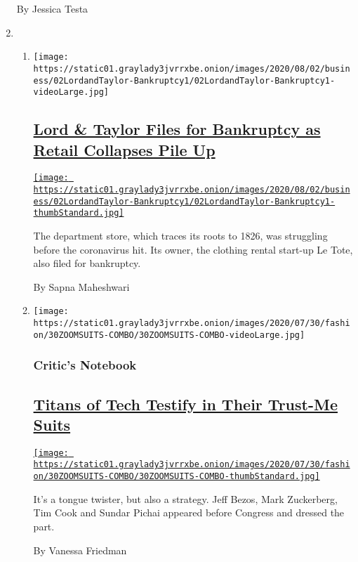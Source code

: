\begin{enumerate}
  By Jessica Testa
\item
  \begin{enumerate}
  \def\labelenumii{\arabic{enumii}.}
  \item
    \texttt{[image: https://static01.graylady3jvrrxbe.onion/images/2020/08/02/business/02LordandTaylor-Bankruptcy1/02LordandTaylor-Bankruptcy1-videoLarge.jpg]}

    \hypertarget{lord--taylor-files-for-bankruptcy-as-retail-collapses-pile-up}{%
    \subsection{\texorpdfstring{\href{/2020/08/02/business/Lord-and-Taylor-Bankruptcy.html}{Lord
    \& Taylor Files for Bankruptcy as Retail Collapses Pile
    Up}}{Lord \& Taylor Files for Bankruptcy as Retail Collapses Pile Up}}\label{lord--taylor-files-for-bankruptcy-as-retail-collapses-pile-up}}

    \href{/2020/08/02/business/Lord-and-Taylor-Bankruptcy.html}{\texttt{[image: https://static01.graylady3jvrrxbe.onion/images/2020/08/02/business/02LordandTaylor-Bankruptcy1/02LordandTaylor-Bankruptcy1-thumbStandard.jpg]}}

    The department store, which traces its roots to 1826, was struggling
    before the coronavirus hit. Its owner, the clothing rental start-up
    Le Tote, also filed for bankruptcy.

    By Sapna Maheshwari
  \item
    \texttt{[image: https://static01.graylady3jvrrxbe.onion/images/2020/07/30/fashion/30ZOOMSUITS-COMBO/30ZOOMSUITS-COMBO-videoLarge.jpg]}

    \hypertarget{critics-notebook}{%
    \subsubsection{Critic's Notebook}\label{critics-notebook}}

    \hypertarget{titans-of-tech-testify-in-their-trust-me-suits}{%
    \subsection{\texorpdfstring{\href{/2020/07/29/style/Bezos-zuckerberg-cook-pichai-testimony-suits.html}{Titans
    of Tech Testify in Their Trust-Me
    Suits}}{Titans of Tech Testify in Their Trust-Me Suits}}\label{titans-of-tech-testify-in-their-trust-me-suits}}

    \href{/2020/07/29/style/Bezos-zuckerberg-cook-pichai-testimony-suits.html}{\texttt{[image: https://static01.graylady3jvrrxbe.onion/images/2020/07/30/fashion/30ZOOMSUITS-COMBO/30ZOOMSUITS-COMBO-thumbStandard.jpg]}}

    It's a tongue twister, but also a strategy. Jeff Bezos, Mark
    Zuckerberg, Tim Cook and Sundar Pichai appeared before Congress and
    dressed the part.

    By Vanessa Friedman
  \end{enumerate}
\end{enumerate}

